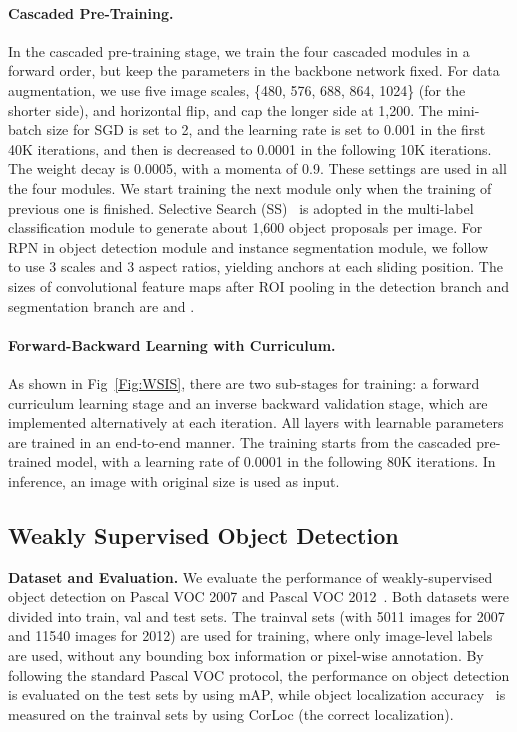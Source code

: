 \documentclass[10pt,twocolumn,letterpaper]{article}
\begin{document}
\paragraph{Cascaded Pre-Training.} In the cascaded pre-training stage, we train the four cascaded modules in a forward order, but keep the parameters in the backbone network fixed. For data augmentation, we use five image scales, \{480, 576, 688, 864, 1024\} (for the shorter side), and horizontal flip, and cap the longer side at 1,200. The mini-batch size for SGD is set to 2, and the learning rate is set to 0.001 in the first 40K iterations, and then is decreased to 0.0001 in the following 10K iterations. The weight decay is 0.0005, with a momenta of 0.9. These settings are used in all the four modules. We start training the next module only when the training of previous one is finished. Selective Search (SS)~\cite{uijlings2013selective} is adopted in the multi-label classification module to generate about 1,600 object proposals per image. For RPN in object detection module and instance segmentation module, we follow~\cite{renNIPS15fasterrcnn} to use 3 scales and 3 aspect ratios, yielding  anchors at each sliding position. The sizes of convolutional feature maps after ROI pooling in the detection branch and segmentation branch are  and .
\paragraph{Forward-Backward Learning with Curriculum.} As shown in Fig~\ref{Fig:WSIS}, there are two sub-stages for training: a forward curriculum learning stage and an inverse  backward validation stage, which are implemented alternatively at each iteration. All layers with learnable parameters are trained in an end-to-end manner. The training starts from the cascaded pre-trained model, with a learning rate of 0.0001 in the following 80K iterations. In inference, an image with original size is used as input.
\vspace{-0mm}

\subsection{Weakly Supervised Object Detection}
\noindent\textbf{Dataset and Evaluation.} We evaluate the performance of weakly-supervised object detection on Pascal VOC 2007 and Pascal VOC 2012~\cite{everingham2015pascal}. Both datasets were divided into train, val and test sets. The trainval sets (with 5011 images for 2007 and 11540 images for 2012) are used for training, where only image-level labels are used, without any bounding box information or pixel-wise annotation. By following the standard Pascal VOC protocol, the performance on object detection is evaluated on the test sets by using mAP, while object localization accuracy~\cite{deselaers2012weakly} is measured on the trainval sets by using  CorLoc (the correct localization).
\end{document}
